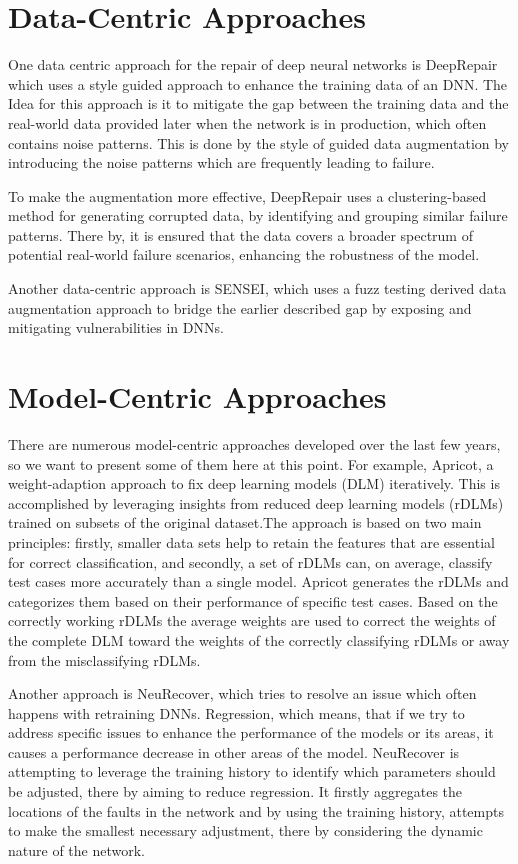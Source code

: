 \section{Data-Centric Approaches}\label{sec:data-centric-approaches}
One data centric approach for the repair of deep neural networks is DeepRepair\cite{yu_deeprepair_2022} which uses a style guided approach to enhance the training data of an DNN. The Idea for this approach is it to mitigate the gap between the training data and the real-world data provided later when the network is in production, which often contains noise patterns.
This is done by the style of guided data augmentation by introducing the noise patterns which are frequently leading to failure.

To make the augmentation more effective, DeepRepair uses a clustering-based method for generating corrupted data, by identifying and grouping similar failure patterns.
There by, it is ensured that the data covers a broader spectrum of potential real-world failure scenarios, enhancing the robustness of the model.

Another data-centric approach is SENSEI\cite{gao_fuzz_2020}, which uses a fuzz testing derived data augmentation approach to bridge the earlier described gap by exposing and mitigating vulnerabilities in DNNs.

\section{Model-Centric Approaches}\label{sec:model-centric-approaches}
There are numerous model-centric approaches developed over the last few years, so we want to present some of them here at this point.
For example, Apricot\cite{zhang_apricot_2019}, a weight-adaption approach to fix deep learning models (DLM) iteratively.
This is accomplished by leveraging insights from reduced deep learning models (rDLMs) trained on subsets of the original dataset.The approach is based on two main principles: firstly, smaller data sets help to retain the features that are essential for correct classification, and secondly, a set of rDLMs can, on average, classify test cases more accurately than a single model.
Apricot generates the rDLMs and categorizes them based on their performance of specific test cases.
Based on the correctly working rDLMs the average weights are used to correct the weights of the complete DLM toward the weights of the correctly classifying rDLMs or away from the misclassifying rDLMs.

Another approach is NeuRecover\cite{tokui_neurecover_2022}, which tries to resolve an issue which often happens with retraining DNNs. Regression, which means, that if we try to address specific issues to enhance the performance of the models or its areas, it causes a performance decrease in other areas of the model.
NeuRecover is attempting to leverage the training history to identify which parameters should be adjusted, there by aiming to reduce regression.
It firstly aggregates the locations of the faults in the network and by using the training history, attempts to make the smallest necessary adjustment, there by considering the dynamic nature of the network.

